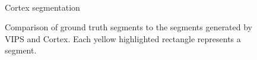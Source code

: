 \begin{figure}
{    
    }%
    \\Cortex segmentation
    \caption{Comparison of ground truth segments to the 
    segments generated by VIPS and Cortex. 
    Each yellow highlighted rectangle represents a segment. }
    \label{fig:output-comparison}
\end{figure}
